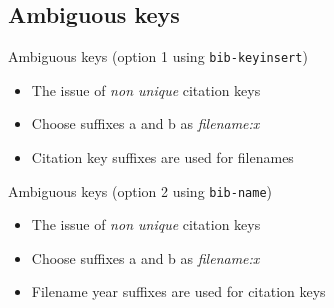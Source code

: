 \documentclass[xcolor={table,dvipsnames}]{beamer}
\renewcommand{\emph}[1]{\textit{\color{orange!90!brown}#1}}
\newcommand{\bashcmd}[2][-0.6\baselineskip]{%
  \vspace{#1}%
}
\newcommand{\bashout}[2][-0.1\baselineskip]{%
  \vspace{#1}%
}
\begin{document}
\subsection{Ambiguous keys}
\begin{frame}{Ambiguous keys (option 1 using \texttt{bib-keyinsert})}
  \begin{itemize}[<+->]
    \item The issue of \emph{non unique} citation keys
      \bashcmd{cmdline/key/uniq-1-in.txt}
      \bashout{cmdline/key/uniq-1-out.txt}

    \item Choose suffixes a and b as \emph{filename:x}
      \bashcmd{cmdline/key/uniq-2-in.txt}
      \bashout{cmdline/key/uniq-2-out.txt}

    \item Citation key suffixes are used for filenames
      \bashcmd{cmdline/key/uniq-3-in.txt}
      \bashout{cmdline/key/uniq-3-out.txt}
  \end{itemize}
\end{frame}

\begin{frame}{Ambiguous keys (option 2 using \texttt{bib-name})}
  \begin{itemize}[<+->]
    \item The issue of \emph{non unique} citation keys
      \bashcmd{cmdline/name/uniq-1-in.txt}
      \bashout{cmdline/name/uniq-1-out.txt}

    \item Choose suffixes a and b as \emph{filename:x}
      \bashcmd{cmdline/name/uniq-2-in.txt}
      \bashout{cmdline/name/uniq-2-out.txt}

    \item Filename year suffixes are used for citation keys
      \bashcmd{cmdline/name/uniq-3-in.txt}
      \bashout{cmdline/name/uniq-3-out.txt}
  \end{itemize}
\end{frame}
\end{document}
